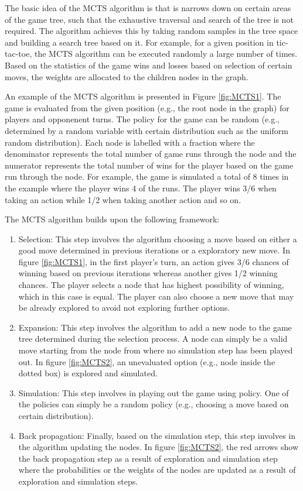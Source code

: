 The basic idea of the \gls{MCTS} algorithm is that is narrows down on certain areas of the game tree, such that the exhaustive traversal and search of the tree is not required. The algorithm achieves this by taking random samples in the tree space and building a search tree based on it. For example, for a given position in tic-tac-toe, the \gls{MCTS} algorithm can be executed randomly a large number of times. Based on the statistics of the game wins and losses based on selection of certain moves, the weights are allocated to the children nodes in the graph.

An example of the \gls{MCTS} algorithm is presented in Figure \ref{fig:MCTS1}. The game is evaluated from the given position (e.g., the root node in the graph) for players and opponenent turns. The policy for the game can be random (e.g., determined by a random variable with certain distribution such as the uniform random distribution). Each node is labelled with a fraction where the denominator represents the total number of game runs through the node and the numerator represents the total number of wins for the player based on the game run through the node. For example, the game is simulated a total of 8 times in the example where the player wins 4 of the runs. The player wins 3/6 when taking an action while 1/2 when taking another action and so on.

The \gls{MCTS} algorithm builds upon the following framework:
\begin{enumerate}
    \item Selection: This step involves the algorithm choosing a move based on either a good move determined in previous iterations or a exploratory new move. In figure \ref{fig:MCTS1}, in the first player's turn, an action gives 3/6 chances of winning based on previous iterations whereas another gives 1/2 winning chances. The player selects a node that has highest possibility of winning, which in this case is equal. The player can also choose a new move that may be already explored to avoid not exploring further options.
    \item Expansion: This step involves the algorithm to add a new node to the game tree determined during the selection process. A node can simply be a valid move starting from the node from where no simulation step has been played out. In figure \ref{fig:MCTS2}, an unevaluated option (e.g., node inside the dotted box) is explored and simulated.
    \item Simulation: This step involves in playing out the game using policy. One of the policies can simply be a random policy (e.g., choosing a move based on certain distribution).
    \item Back propagation: Finally, based on the simulation step, this step involves in the algorithm updating the nodes. In figure \ref{fig:MCTS2}, the red arrows show the back propagation step as a result of exploration and simulation step where the probabilities or the weights of the nodes are updated as a result of exploration and simulation steps.
\end{enumerate}

